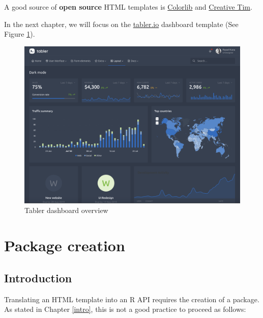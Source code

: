 \documentclass[
]{book}
\begin{document}
A good source of \textbf{open source} HTML templates is \href{https://colorlib.com}{Colorlib} and \href{https://www.creative-tim.com/bootstrap-themes/free}{Creative Tim}.

In the next chapter, we will focus on the \href{https://preview-dev.tabler.io/layout-dark.html}{tabler.io} dashboard template (See Figure \ref{fig:tabler-dark}).

\begin{figure}
\includegraphics[width=34.33in]{images/practice/tabler-dark} \caption{Tabler dashboard overview}\label{fig:tabler-dark}
\end{figure}

\hypertarget{custom-templates-package}{%
\chapter{Package creation}\label{custom-templates-package}}

\hypertarget{introduction-3}{%
\section{Introduction}\label{introduction-3}}

Translating an HTML template into an R API requires the creation of a package. As stated in Chapter \ref{intro}, this is not a good practice to proceed as follows:
\end{document}
